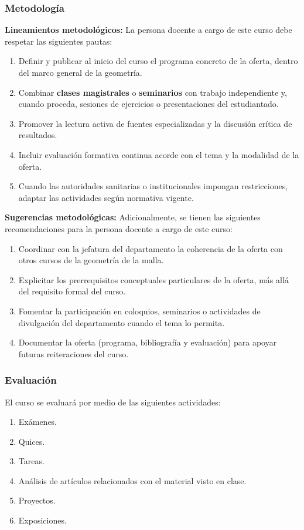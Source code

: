 \begin{refsection}
\subsubsection*{Metodología}

\noindent \textbf{Lineamientos metodológicos:} La persona docente a cargo de este curso debe respetar las siguientes pautas:

\begin{enumerate}
    \item Definir y publicar al inicio del curso el programa concreto de la oferta, dentro del marco general de la geometría.
    \item Combinar \textbf{clases magistrales} o \textbf{seminarios} con trabajo independiente y, cuando proceda, sesiones de ejercicios o presentaciones del estudiantado.
    \item Promover la lectura activa de fuentes especializadas y la discusión crítica de resultados.
    \item Incluir evaluación formativa continua acorde con el tema y la modalidad de la oferta.
    \item Cuando las autoridades sanitarias o institucionales impongan restricciones, adaptar las actividades según normativa vigente.
\end{enumerate}

\textbf{Sugerencias metodológicas:} Adicionalmente, se tienen las siguientes recomendaciones para la persona docente a cargo de este curso:

\begin{enumerate}
    \item Coordinar con la jefatura del departamento la coherencia de la oferta con otros cursos de la geometría de la malla.
    \item Explicitar los prerrequisitos conceptuales particulares de la oferta, más allá del requisito formal del curso.
    \item Fomentar la participación en coloquios, seminarios o actividades de divulgación del departamento cuando el tema lo permita.
    \item Documentar la oferta (programa, bibliografía y evaluación) para apoyar futuras reiteraciones del curso.
\end{enumerate}

\subsubsection*{Evaluación}

El curso se evaluará por medio de las siguientes actividades:

\begin{enumerate}
\item Exámenes.
\item Quices.
\item Tareas.
\item Análisis de artículos relacionados con el material visto en clase.
\item Proyectos.
\item Exposiciones.
\end{enumerate}

\end{refsection}
